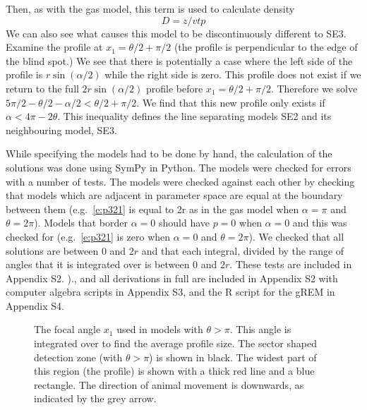 \documentclass[a4paper,10pt,reqno,oneside]{amsart}
\begin{document}
Then, as with the gas model, this term is used to calculate density
\begin{equation}
\label{e:gas}
D = z/vtp
\end{equation}
We can also see what causes this model to be discontinuously different to SE3. Examine the profile at $x_1 = 	\theta/2 + \pi/2$ (the profile is perpendicular to the edge of the blind spot.) We see that there is potentially a case where the left side of the profile is $r\sin( \alpha/2)$ while the right side is zero. This profile does not exist if we return to the full $2r\sin( \alpha/2)$ profile before $x_1  = \theta/2 + \pi/2$. Therefore we solve $5\pi/2 - \theta/2 - \alpha/2 <  \theta/2 + \pi/2$. We find that this new profile only exists if $ \alpha < 4\pi - 2 \theta$. This inequality defines the line separating models SE2 and its neighbouring model, SE3.

While specifying the models had to be done by hand, the calculation of the solutions was done using SymPy \citep{sympy} in Python. The models were checked for errors with a number of tests. The models were checked against each other by checking that models which are adjacent in parameter space are equal at the boundary between them (e.g.~\ref{e:p321} is equal to 2r as in the gas model when $\alpha=\pi$ and $\theta=2\pi$). Models that border $ \alpha = 0$ should have $p = 0$ when $ \alpha = 0$ and this was checked for (e.g.~\ref{e:p321} is zero when $\alpha=0$ and $\theta=2\pi$). We checked that all solutions are between 0 and $2r$ and that each integral, divided by the range of angles that it is integrated over is between 0 and $2r$. These tests are included in Appendix S2. )., and all derivations in full are included in Appendix S2 with computer algebra scripts in Appendix S3, and the R \citep{} script for the gREM in Appendix S4.  

\begin{figure}[t]
        \centering
\caption{The focal angle $x_1$ used in models with $\theta>\pi$. This angle is integrated over to find the average profile size. The sector shaped detection zone (with $\theta>\pi$) is shown in black. The widest part of this region (the profile) is shown with a thick red line and a blue rectangle. The direction of animal movement is downwards, as indicated by the grey arrow. 
     }
\label{f:x1}
\end{figure}
\end{document}
